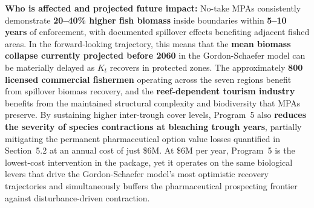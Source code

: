 \documentclass[10pt,letterpaper]{article}
\begin{document}
\begin{tcolorbox}[title=Program 5: MPA Monitoring Services --- \$6M Annual Total,
  colback=violet!5, colframe=violet!60!black, fonttitle=\bfseries, breakable]
  \medskip
  \textbf{Who is affected and projected future impact:} No-take MPAs consistently demonstrate
  \textbf{20--40\% higher fish biomass} inside boundaries within \textbf{5--10 years} of
  enforcement, with documented spillover effects benefiting adjacent fished areas. In the
  forward-looking trajectory, this means that the \textbf{mean biomass collapse currently
  projected before 2060} in the Gordon-Schaefer model can be materially delayed as $K_t$
  recovers in protected zones. The approximately \textbf{800 licensed commercial fishermen}
  operating across the seven regions benefit from spillover biomass recovery, and the
  \textbf{reef-dependent tourism industry} benefits from the maintained structural complexity
  and biodiversity that MPAs preserve. By sustaining higher inter-trough cover levels, Program~5
  also \textbf{reduces the severity of species contractions at bleaching trough years}, partially
  mitigating the permanent pharmaceutical option value losses quantified in Section~5.2 at an
  annual cost of just \$6M. At \$6M per year, Program~5 is the lowest-cost intervention in the
  package, yet it operates on the same biological levers that drive the Gordon-Schaefer model's
  most optimistic recovery trajectories and simultaneously buffers the pharmaceutical
  prospecting frontier against disturbance-driven contraction.
\end{tcolorbox}

\medskip
\end{document}

